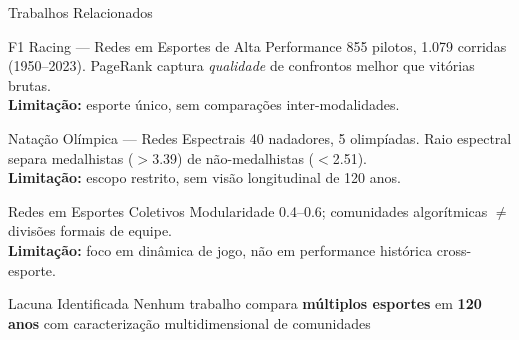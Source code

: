 \begin{frame}[shrink=6]{Trabalhos Relacionados}

    \begin{block}{F1 Racing \cite{brasnam2024F1} --- Redes em Esportes de Alta Performance}
        \footnotesize
        855 pilotos, 1.079 corridas (1950--2023). PageRank captura \textit{qualidade} de confrontos melhor que vitórias brutas.\\
        \textbf{Limitação:} esporte único, sem comparações inter-modalidades.
    \end{block}

    \vspace{0.1cm}

    \begin{block}{Natação Olímpica \cite{buldu2019complex} --- Redes Espectrais}
        \footnotesize
        40 nadadores, 5 olimpíadas. Raio espectral separa medalhistas ($>$3.39) de não-medalhistas ($<$2.51).\\
        \textbf{Limitação:} escopo restrito, sem visão longitudinal de 120 anos.
    \end{block}

    \vspace{0.1cm}

    \begin{block}{Redes em Esportes Coletivos \cite{warnick2016network}}
        \footnotesize
        Modularidade 0.4--0.6; comunidades algorítmicas $\neq$ divisões formais de equipe.\\
        \textbf{Limitação:} foco em dinâmica de jogo, não em performance histórica cross-esporte.
    \end{block}

    \vspace{0.1cm}

    \begin{alertblock}{Lacuna Identificada}
        \footnotesize\centering
        Nenhum trabalho compara \textbf{múltiplos esportes} em \textbf{120 anos} com caracterização multidimensional de comunidades
    \end{alertblock}

\end{frame}

